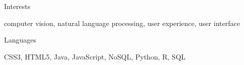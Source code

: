 \documentclass[a4paper,9pt]{article}
\begin{document}
\vspace{1ex}
\begin{minipage}[t]{0.20\linewidth}
	\begin{small}
		\begin{spacing}{1.00}
			\begin{flushright}
				Interests
			\end{flushright}
		\end{spacing}
	\end{small}
\end{minipage}
\hspace{4mm}
\begin{minipage}[t]{0.75\linewidth}
	\begin{small}
		\begin{spacing}{1.00}
			\begin{flushleft}
				computer vision, natural language processing, user experience, user interface
			\end{flushleft}
		\end{spacing}
	\end{small}
\end{minipage}

\vspace{-3ex}
\begin{minipage}[t]{0.20\linewidth}
	\begin{small}
		\begin{spacing}{1.00}
			\begin{flushright}
				Languages
			\end{flushright}
		\end{spacing}
	\end{small}
\end{minipage}
\hspace{4mm}
\begin{minipage}[t]{0.75\linewidth}
	\begin{small}
		\begin{spacing}{1.00}
			\begin{flushleft}
				CSS3, HTML5, Java, JavaScript, NoSQL, Python, R, SQL
			\end{flushleft}
		\end{spacing}
	\end{small}
\end{minipage}
\end{document}
